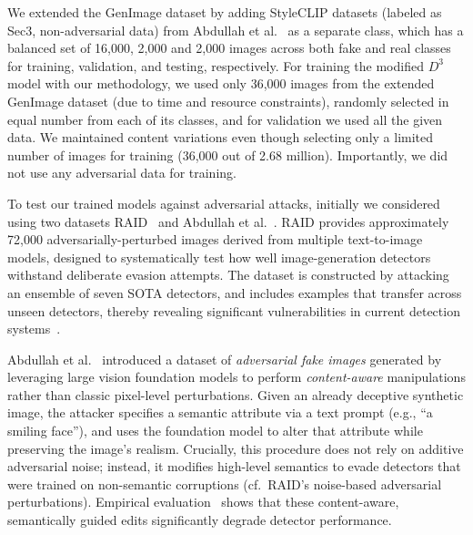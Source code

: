 \documentclass[letterpaper,twocolumn,10pt]{article}
\newcommand{\subhead}[1]{\vspace{1pt}\noindent{\textbf{#1.}}}
\begin{document}
We extended the GenImage dataset by adding StyleCLIP datasets (labeled as Sec3, non-adversarial data) from Abdullah et al.~\cite{Sifat2024evolvingthreat} as a separate class, which has a balanced set of 16,000, 2,000 and 2,000 images across both fake and real classes for training, validation, and testing, respectively. For training the modified $D^3$ model with our methodology, we used only 36,000 images from the extended GenImage dataset (due to time and resource constraints), randomly selected in equal number from each of its classes, and for validation we used all the given data.  
We maintained content variations even though selecting only a limited number of images for training (36,000 out of 2.68 million). Importantly, we did not use any adversarial data for training. 



\subhead{Datasets for testing}
To test our trained models against adversarial attacks, initially we considered using two datasets RAID~\cite{eddoubi2025raiddatasettestingadversarial} and Abdullah et al.~\cite{Sifat2024evolvingthreat}. 
RAID provides approximately 72,000 adversarially-perturbed images derived from multiple text-to-image models, designed to systematically test how well image-generation detectors withstand deliberate evasion attempts. The dataset is constructed by attacking an ensemble of seven SOTA detectors, and includes examples that transfer across unseen detectors, thereby revealing significant vulnerabilities in current detection systems~\cite{eddoubi2025raiddatasettestingadversarial}. 

Abdullah et al.~\cite{Sifat2024evolvingthreat} introduced a dataset of \emph{adversarial fake images} generated by leveraging large vision foundation models to perform \emph{content-aware} manipulations rather than classic pixel-level perturbations.  Given an already deceptive synthetic image, the attacker specifies a semantic attribute via a text prompt (e.g., ``a smiling face''), and uses the foundation model to alter that attribute while preserving the image's realism.  Crucially, this procedure does not rely on additive adversarial noise; instead, it modifies high-level semantics to evade detectors that were trained on non-semantic corruptions (cf.\ RAID's noise-based adversarial perturbations).  Empirical evaluation~\cite{Sifat2024evolvingthreat} shows that these content-aware, semantically guided edits significantly degrade detector performance. 
\end{document}
